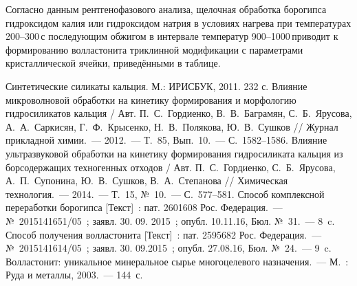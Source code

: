 Согласно данным рентгенофазового анализа, щелочная обработка борогипса гидроксидом калия или гидроксидом натрия в условиях нагрева при температурах 200--300\,\dgc с последующим обжигом в интервале температур 900--1000\,\dgc приводит к формированию волластонита триклинной модификации с параметрами кристаллической ячейки, приведёнными в таблице.


\vspace{-20pt}
\begin{thebibliography}{99}
\bibitem{} Синтетические силикаты кальция. М.: ИРИСБУК, 2011. 232 с.
\bibitem{} Влияние микроволновой обработки на кинетику формирования и морфологию гидросиликатов кальция / Авт. П.~С.~Гордиенко, В.~В.~Баграмян, С.~Б.~Ярусова, А.~А.~Саркисян, Г.~Ф.~Крысенко, Н.~В.~Полякова, Ю.~В.~Сушков // Журнал прикладной химии.~--- 2012.~--- Т.~85, Вып.~10.~--- С.~1582--1586.
\bibitem{} Влияние ультразвуковой обработки на кинетику формирования гидросиликата кальция из борсодержащих техногенных отходов / Авт. П.~С.~Гордиенко, С.~Б.~Ярусова, А.~П.~Супонина, Ю.~В.~Сушков, В.~А.~Степанова // Химическая технология.~--- 2014.~--- Т.~15, №~10.~--- С.~577--581.
\bibitem{}Способ комплексной переработки борогипса [Текст]~: пат. 2601608 Рос. Федерация.~--- №~2015141651/05~; заявл. 30. 09. 2015~; опубл. 10.11.16, Бюл. №~31.~--- 8~c.
\bibitem{}Способ получения волластонита [Текст]~: пат. 2595682 Рос. Федерация.~--- №~2015141614/05~; заявл. 30. 09.2015~; опубл. 27.08.16, Бюл. №~24.~--- 9~c.
\bibitem{} Волластонит: уникальное минеральное сырье многоцелевого назначения.~--- М.~: Руда и металлы, 2003.~--- 144~с.

\end{thebibliography}
